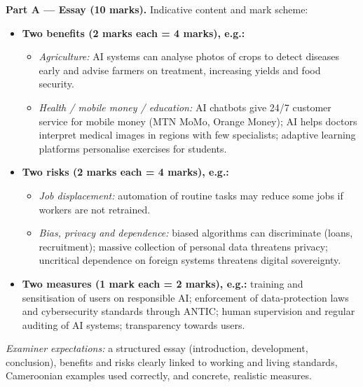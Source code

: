 \documentclass[11pt]{article}
\begin{document}
\begin{corrige}
\textbf{Part A — Essay (10 marks).} Indicative content and mark scheme:
\begin{itemize}
\item \textbf{Two benefits (2 marks each = 4 marks), e.g.:}
\begin{itemize}
\item \emph{Agriculture:} AI systems can analyse photos of crops to detect diseases early and advise farmers on treatment, increasing yields and food security.
\item \emph{Health / mobile money / education:} AI chatbots give 24/7 customer service for mobile money (MTN MoMo, Orange Money); AI helps doctors interpret medical images in regions with few specialists; adaptive learning platforms personalise exercises for students.
\end{itemize}
\item \textbf{Two risks (2 marks each = 4 marks), e.g.:}
\begin{itemize}
\item \emph{Job displacement:} automation of routine tasks may reduce some jobs if workers are not retrained.
\item \emph{Bias, privacy and dependence:} biased algorithms can discriminate (loans, recruitment); massive collection of personal data threatens privacy; uncritical dependence on foreign systems threatens digital sovereignty.
\end{itemize}
\item \textbf{Two measures (1 mark each = 2 marks), e.g.:} training and sensitisation of users on responsible AI; enforcement of data-protection laws and cybersecurity standards through ANTIC; human supervision and regular auditing of AI systems; transparency towards users.
\end{itemize}
\emph{Examiner expectations:} a structured essay (introduction, development, conclusion), benefits and risks clearly linked to working and living standards, Cameroonian examples used correctly, and concrete, realistic measures.


\end{corrige}
\end{document}
